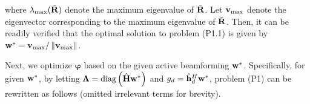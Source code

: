 \documentclass[draftclsnofoot,onecolumn,12pt]{IEEEtran}
\begin{document}
where $\lambda_{\max}( \tilde{\bf R} )$ denote the maximum eigenvalue of $\tilde{\bf R}$. Let ${\bf v}_{\max}$ denote the eigenvector corresponding to the maximum eigenvalue of $\tilde{\bf R}$. Then, it can be readily verified that the optimal solution to problem (P1.1) is given by ${\bf w}^*={\bf v}_{\max}/\left\| {\bf v}_{\max} \right\|$.  

Next, we optimize ${\bm \varphi}$ based on the given active beamforming ${\bf w}^*$. 
Specifically, for given ${\bf w}^*$, by letting ${\bf \Lambda}= \text{diag}\left(\hat{{\bf H}}  {\bf w}^*\right)$ and ${{g}}_d= \hat{{\bf h}}_d^H {\bf w}^*$, 
problem (P1) can be rewritten as follows (omitted irrelevant terms  for brevity). 
\end{document}
